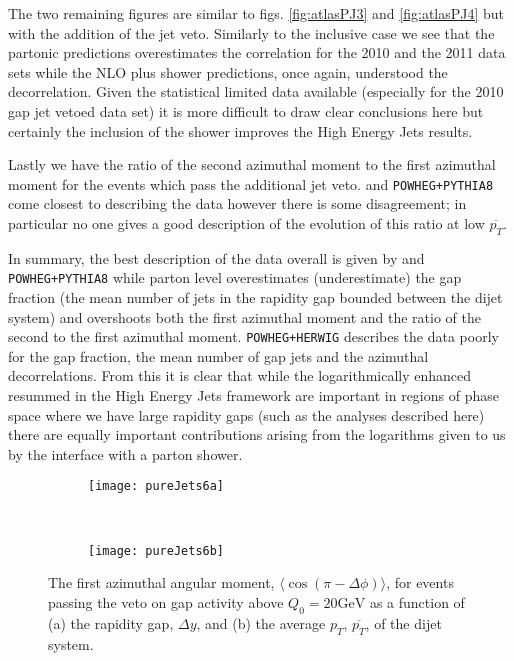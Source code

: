 	The two remaining figures are similar to figs. \eqref{fig:atlasPJ3} and \eqref{fig:atlasPJ4} but
	with the addition of the jet veto.  Similarly to the inclusive case we see that the partonic \HEJ
	predictions overestimates the correlation for the 2010 and the 2011 data sets while the NLO plus
	shower predictions, once again, understood the decorrelation.  Given the statistical limited
	data available (especially for the 2010 gap jet vetoed data set) it is more difficult to draw
	clear conclusions here but certainly the inclusion of the \ARIADNE shower improves the High
	Energy Jets results.

	Lastly we have the ratio of the second azimuthal moment to the first azimuthal moment for the
	events which pass the additional jet veto.  \HEJA and \texttt{POWHEG+PYTHIA8} come closest
	to describing the data however there is some disagreement; in particular no one gives a good
	description of the evolution of this ratio at low $\overline{p_T}$.

	In summary, the best description of the data overall is given by \HEJA and \texttt{POWHEG+PYTHIA8}
	while parton level \HEJ overestimates (underestimate) the gap fraction (the mean number of jets
	in the rapidity gap bounded between the dijet system) and overshoots both the first azimuthal
	moment and the ratio of the second to the first azimuthal moment.  \texttt{POWHEG+HERWIG} describes
	the data poorly for the gap fraction, the mean number of gap jets and the azimuthal decorrelations.
	From this it is clear that while the logarithmically enhanced resummed in the High Energy Jets
	framework are important in regions of phase space where we have large rapidity gaps (such as the
	analyses described here) there are equally important contributions arising from the logarithms
	given to us by the interface with a parton shower.

	\begin{figure}[bth]
		\centering
		\begin{subfigure}[b]{0.48\textwidth}
			\texttt{[image: pureJets6a]}
			\caption{}
			\label{fig:}
		\end{subfigure}
		~
		\begin{subfigure}[b]{0.48\textwidth}
			\texttt{[image: pureJets6b]}
			\caption{}
			\label{fig:}
		\end{subfigure}
		\caption{The first azimuthal angular moment, $\langle \cos(\pi-\Delta\phi)\rangle$,
		for events passing the veto on gap activity above $Q_0=20\text{GeV}$ as a function
		of (a) the rapidity gap, $\Delta y$, and (b) the average $p_T$, $\overline{p_T}$,
		of the dijet system.}
		\label{fig:atlasPJ5}
	\end{figure}

